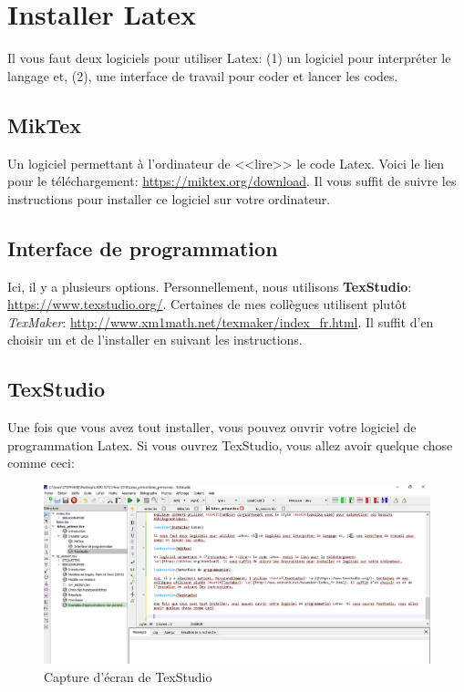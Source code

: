 \documentclass[12pt]{article}
\begin{document}
   \section{Installer Latex}
   
   Il vous faut deux logiciels pour utiliser Latex: (1) un logiciel pour interpréter le langage et, (2), une interface de travail pour coder et lancer les codes.
   
   \subsection{MikTex}
   
   Un logiciel permettant à l'ordinateur de <<lire>> le code Latex. Voici le lien pour le téléchargement:
   \url{https://miktex.org/download}. Il vous suffit de suivre les instructions pour installer ce logiciel sur votre ordinateur.
   
   \subsection{Interface de programmation}
   
   Ici, il y a plusieurs options. Personnellement, nous utilisons \textbf{TexStudio}: \url{https://www.texstudio.org/}. Certaines de mes collègues utilisent plutôt \textit{TexMaker}: \url{http://www.xm1math.net/texmaker/index_fr.html}. Il suffit d'en choisir un et de l'installer en suivant les instructions.
   
   \subsection{TexStudio}
   
   Une fois que vous avez tout installer, vous pouvez ouvrir votre logiciel de programmation Latex. Si vous ouvrez TexStudio, vous allez avoir quelque chose comme ceci: \\
   
   \begin{figure}[H]
   	  \includegraphics[width=5.5in]{texstudio_screenshot.png}
   	  \caption{Capture d'écran de TexStudio}
   \end{figure}
   
\end{document}
